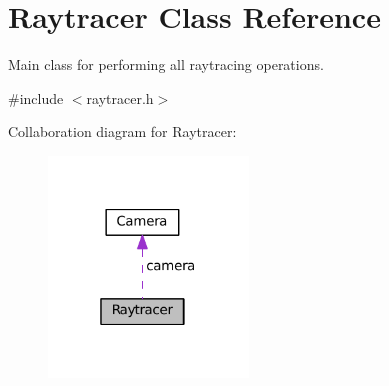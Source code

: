 \section{Raytracer Class Reference}
\label{class_raytracer}


Main class for performing all raytracing operations.  




{\ttfamily \#include $<$raytracer.\+h$>$}



Collaboration diagram for Raytracer\+:
\nopagebreak
\begin{figure}[H]
\begin{center}
\leavevmode
\includegraphics[width=151pt]{class_raytracer__coll__graph}
\end{center}
\end{figure}
